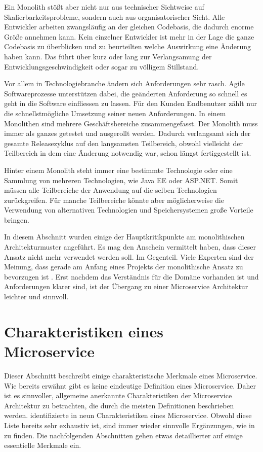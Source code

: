 Ein Monolith stößt aber nicht nur aus technischer Sichtweise auf Skalierbarkeitsprobleme, sondern auch aus organisatorischer Sicht. Alle Entwickler arbeiten zwangsläufig an der gleichen Codebasis, die dadurch enorme Größe annehmen kann. Kein einzelner Entwickler ist mehr in der Lage die ganze Codebasis zu überblicken und zu beurteilten welche Auswirkung eine Änderung haben kann. Das führt über kurz oder lang zur Verlangsamung der Entwicklungsgeschwindigkeit oder sogar zu völligem Stillstand.

Vor allem in Technologiebranche ändern sich Anforderungen sehr rasch. Agile Softwareprozesse unterstützen dabei, die geänderten Anforderung so schnell es geht in die Software einfliessen zu lassen. Für den Kunden \bzw Endbenutzer zählt nur die schnellstmögliche Umsetzung seiner neuen Anforderungen. In einem Monolithen sind mehrere Geschäftsbereiche zusammengefasst. Der Monolith muss immer als ganzes getestet und ausgerollt werden. Dadurch verlangsamt sich der gesamte Releasezyklus auf den langsamsten Teilbereich, obwohl vielleicht der Teilbereich in dem eine Änderung notwendig war, schon längst fertiggestellt ist.

Hinter einem Monolith steht immer eine bestimmte Technologie oder eine Sammlung von mehreren Technologien, wie \zB Java EE oder ASP.NET. Somit müssen alle Teilbereiche der Anwendung auf die selben Technologien zurückgreifen. Für manche Teilbereiche könnte aber möglicherweise die Verwendung von alternativen Technologien und Speichersystemen große Vorteile bringen.

In diesem Abschnitt wurden einige der Hauptkritikpunkte am monolithischen Architekturmuster angeführt. Es mag den Anschein vermittelt haben, dass dieser Ansatz nicht mehr verwendet werden soll. Im Gegenteil. Viele Experten sind der Meinung, dass gerade am Anfang eines Projekts der monolithische Ansatz zu bevorzugen ist \cite{FowlerMolithFist}. Erst nachdem das Verständnis für die Domäne vorhanden ist und Anforderungen klarer sind, ist der Übergang zu einer Microservice Architektur leichter und sinnvoll. 

\section{Charakteristiken eines Microservice}

Dieser Abschnitt beschreibt einige charakteristische Merkmale eines Microservice. Wie bereits erwähnt gibt es keine eindeutige Definition eines Microservice. Daher ist es sinnvoller, allgemeine anerkannte Charakteristiken der Microservice Architektur zu betrachten, die durch die meisten Definitionen beschrieben werden. 
\citeauthor{FowlerMS} identifizierte in \cite{FowlerMS} neun Charakteristiken eines Microservice. Obwohl diese Liste bereits sehr exhaustiv ist, sind immer wieder sinnvolle Ergänzungen, wie in \cite{HorsdalMS} zu finden. Die nachfolgenden Abschnitten gehen etwas detaillierter auf einige essentielle Merkmale ein.

